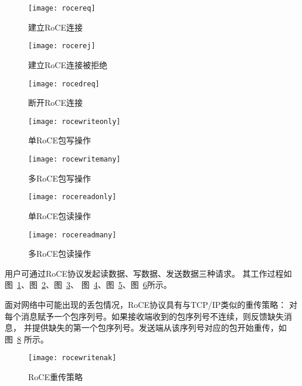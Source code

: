 \begin{figure}[htbp]
\centering
\texttt{[image: rocereq]}
\caption{建立RoCE连接} \label{fig:rocereq}
\end{figure}

\begin{figure}[htbp]
\centering
\texttt{[image: rocerej]}
\caption{建立RoCE连接被拒绝} \label{fig:rocerej}
\end{figure}

\begin{figure}[htbp]
\centering
\texttt{[image: rocedreq]}
\caption{断开RoCE连接} \label{fig:rocedreq}
\end{figure}

\begin{figure}[htbp]
\centering
\texttt{[image: rocewriteonly]}
\caption{单RoCE包写操作} \label{fig:rocewriteonly}
\end{figure}

\begin{figure}[htbp]
\centering
\texttt{[image: rocewritemany]}
\caption{多RoCE包写操作} \label{fig:rocewritemany}
\end{figure}

\begin{figure}[htbp]
\centering
\texttt{[image: rocereadonly]}
\caption{单RoCE包读操作} \label{fig:rocereadonly}
\end{figure}

\begin{figure}[htbp]
\centering
\texttt{[image: rocereadmany]}
\caption{多RoCE包读操作} \label{fig:rocereadmany}
\end{figure}

用户可通过RoCE协议发起读数据、写数据、发送数据三种请求。
其工作过程如图~\ref{fig:rocereq}、图~\ref{fig:rocerej}、图~\ref{fig:rocedreq}、
图~\ref{fig:rocewriteonly}、图~\ref{fig:rocewritemany}、图~\ref{fig:rocereadonly}所示。

面对网络中可能出现的丢包情况，RoCE协议具有与TCP/IP类似的重传策略：
对每个消息赋予一个包序列号。如果接收端收到的包序列号不连续，则反馈缺失消息，
并提供缺失的第一个包序列号。发送端从该序列号对应的包开始重传，如图~\ref{fig:rocewritenak} 所示。
\begin{figure}[htbp]
\centering
\texttt{[image: rocewritenak]}
\caption{RoCE重传策略} \label{fig:rocewritenak}
\end{figure}
